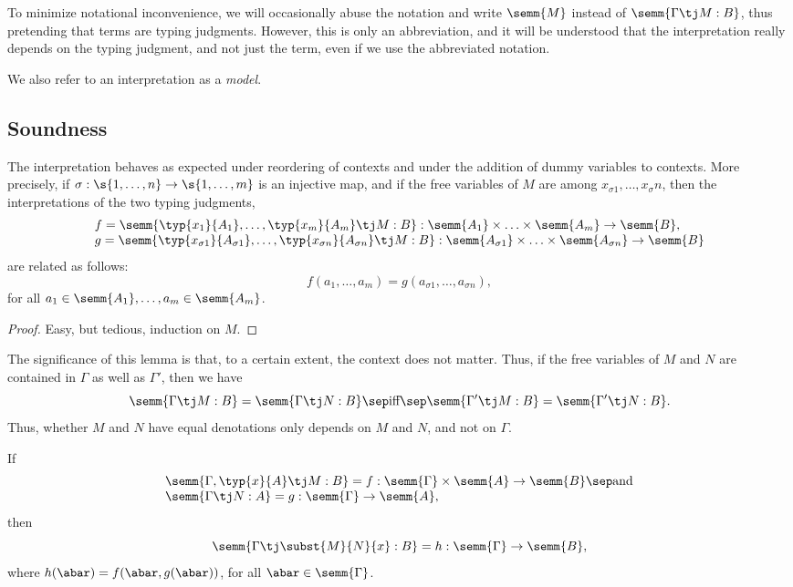 \documentclass[12pt]{article}
\begin{document}
To minimize notational inconvenience, we will occasionally abuse the
notation and write $\semm{M}$ instead of $\semm{\Gamma\tj M:B}$, thus
pretending that terms are typing judgments. However, this is only an
abbreviation, and it will be understood that the interpretation really
depends on the typing judgment, and not just the term, even if we use
the abbreviated notation.

We also refer to an interpretation as a {\em model}.

\subsection{Soundness}

\begin{lemma}\label{lem-context-set}
  The interpretation behaves as expected under reordering of contexts
  and under the addition of dummy variables to contexts. More
  precisely, if $\sigma:\s{1,\ldots,n}\to\s{1,\ldots,m}$ is an
  injective map, and if the free variables of $M$ are among
  $x_{\sigma 1},\ldots,x_\sigma n$, then the interpretations of the
  two typing judgments,
  \[ \begin{array}{l}
    f = \semm{\typ{x_1}{A_1},\ldots,\typ{x_m}{A_m}\tj M:B}
    : \semm{A_1}\times\ldots\times\semm{A_m} \to \semm{B}, \\
    g = \semm{\typ{x_{\sigma 1}}{A_{\sigma 1}},\ldots,
      \typ{x_{\sigma n}}{A_{\sigma n}} \tj M:B} 
    : \semm{A_{\sigma 1}}\times\ldots\times\semm{A_{\sigma n}} \to \semm{B}
  \end{array}
  \]
  are related as follows:
  \[  f(a_1,\ldots,a_m) = g(a_{\sigma 1},\ldots,a_{\sigma n}),
  \]
  for all $a_1\in\semm{A_1},\ldots,a_m\in\semm{A_m}$.
\end{lemma}

\begin{proof}
  Easy, but tedious, induction on $M$.\eot
\end{proof}

The significance of this lemma is that, to a certain extent, the
context does not matter. Thus, if the free variables of $M$ and $N$
are contained in $\Gamma$ as well as $\Gamma'$, then we have 
\[ \semm{\Gamma\tj M:B}=\semm{\Gamma\tj N:B} \sep\mbox{iff}\sep
 \semm{\Gamma'\tj M:B}=\semm{\Gamma'\tj N:B}.
\]
Thus, whether $M$ and $N$ have equal denotations only depends on $M$
and $N$, and not on $\Gamma$.

\begin{lemma}
  If 
  \[ \begin{array}{l}
    \semm{\Gamma,\typ{x}{A}\tj M:B} = f 
    : \semm{\Gamma}\times\semm{A}\to\semm{B}\sep\mbox{and}\\
    \semm{\Gamma\tj N:A} = g
    : \semm{\Gamma}\to\semm{A},
  \end{array}
  \]
  then
  \[ \semm{\Gamma\tj \subst{M}{N}{x}:B} = h
  : \semm{\Gamma}\to\semm{B},
  \]
  where $h(\abar) = f(\abar,g(\abar))$, for all
  $\abar\in\semm{\Gamma}$.
\end{lemma}
\end{document}
